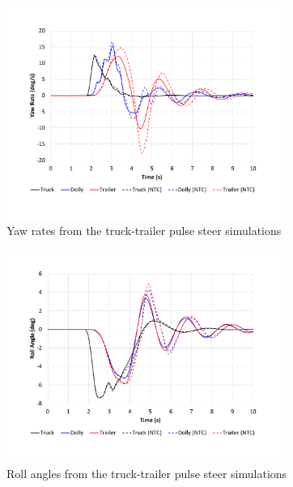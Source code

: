 \begin{figure}[H]
	\centering
	\includegraphics[width=0.8\textwidth]{fig/ntc-truck-trailer_psb}
	\caption{Yaw rates from the truck-trailer pulse steer simulations}
	\label{figure:ntc-truck-trailer_psb}
\end{figure}

\begin{figure}[H]
	\centering
	\includegraphics[width=0.8\textwidth]{fig/ntc-truck-trailer_psc}
	\caption{Roll angles from the truck-trailer pulse steer simulations}
	\label{figure:ntc-truck-trailer_psc}
\end{figure}

